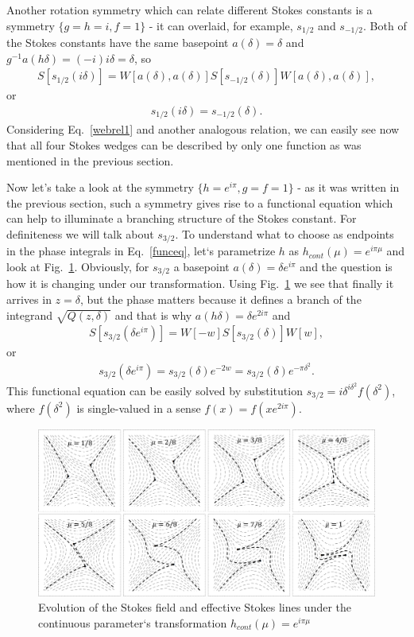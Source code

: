 \documentclass[aps,prl,preprint,superscriptaddress]{revtex4}
\begin{document}
Another rotation symmetry which can relate different Stokes constants is a symmetry $\{g=h=i,f=1\}$ - it can overlaid, for example, 
$s_{1/2}$ and $s_{-1/2}$. Both of the Stokes constants have the same basepoint $a(\delta)=\delta$ 
and $g^{-1}a(h\delta)=(-i)i\delta=\delta$, so
\begin{eqnarray}
S[s_{1/2}(i\delta)] = W[a(\delta),a(\delta)]S[s_{-1/2}(\delta)]W[a(\delta),a(\delta)],
\label{webrs2}
\end{eqnarray}
or
\begin{eqnarray}
s_{1/2}(i\delta) = s_{-1/2}(\delta).
\label{webrel2}
\end{eqnarray}
Considering Eq.~\ref{webrel1} and another analogous relation, we can easily see now that all four Stokes wedges can be described by only one function as was mentioned in the previous section. 

Now let's take a look at the symmetry $\{h=e^{i\pi},g=f=1\}$ - as it was written in the previous section, such a symmetry gives rise to a functional equation which can help to illuminate a branching structure of the Stokes constant. 
For definiteness we will talk about $s_{3/2}$. To understand what to choose as endpoints in the phase integrals in Eq.~\ref{funceq}, let`s parametrize $h$ as $h_{cont}(\mu)=e^{i\pi\mu}$ and look at Fig.~\ref{wrs}. Obviously, for $s_{3/2}$ a basepoint $a(\delta)=\delta e^{i\pi}$ and the question is how it is changing under our transformation. Using Fig.~\ref{wrs} we see that finally it arrives in $z=\delta$, but the phase matters because it defines a branch of the integrand $\sqrt{Q(z,\delta)}$ and that is why 
$a(h\delta)=\delta e^{2i\pi}$ and
\begin{eqnarray}
S[s_{3/2}(\delta e^{i\pi})] = W[-w]S[s_{3/2}(\delta)]W[w],
\label{webrs3}
\end{eqnarray}
or
\begin{eqnarray}
s_{3/2}(\delta e^{i\pi})=s_{3/2}(\delta)e^{-2w}=s_{3/2}(\delta)e^{-\pi\delta^2}.
\label{webrel3}
\end{eqnarray}
This functional equation can be easily solved by substitution $s_{3/2}=i\delta^{i\delta^2}f(\delta^2)$, where $f(\delta^2)$
is single-valued in a sense $f(x)=f(x e^{2i\pi})$.

\begin{figure}
\centering
\noindent
\includegraphics[scale=.5]{stuff/wrs.png}
\caption{Evolution of the Stokes field and effective Stokes lines 
under the continuous parameter`s transformation $h_{cont}(\mu)=e^{i\pi\mu}$}
\label{wrs}
\end{figure} 
\end{document}
